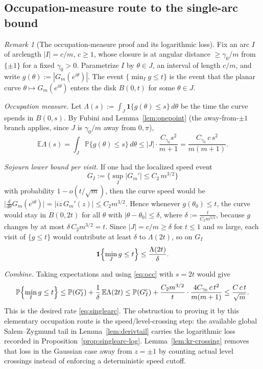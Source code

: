 \documentclass[11pt]{amsart}
\numberwithin{equation}{section}
\theoremstyle{definition}
\theoremstyle{remark}
\newtheorem{remark}[theorem]{Remark}
\newcommand{\Prob}{\mathbb P}
\newcommand{\Exp}{\mathbb E}
\newcommand{\abs}[1]{\left\lvert #1\right\rvert}
\begin{document}
\subsection{Occupation-measure route to the single-arc bound}

\begin{remark}[The occupation-measure proof and its logarithmic loss]
Fix an arc $I$ of arclength $\abs I=c/m$, $c\ge1$, whose closure is at angular distance $\ge\gamma_0/m$ from $\{\pm1\}$ for a fixed $\gamma_0>0$. Parametrize $I$ by $\theta\in J$, an interval of length $c/m$, and write $g(\theta):=\abs{G_m(e^{i\theta})}$. The event $\{\min_I g\le t\}$ is the event that the planar curve $\theta\mapsto G_m(e^{i\theta})$ enters the disk $B(0,t)$ for some $\theta\in J$.

\emph{Occupation measure.} Let $\Lambda(s):=\int_J\mathbf1\{g(\theta)\le s\}\,d\theta$ be the time the curve spends in $B(0,s)$. By Fubini and Lemma~\ref{lem:onepoint} (the away-from-$\pm1$ branch applies, since $J$ is $\gamma_0/m$ away from $0,\pi$),
\begin{equation}\label{eq:occ}
  \Exp\Lambda(s)=\int_J\Prob\{g(\theta)\le s\}\,d\theta\le\abs J\cdot\frac{C_{\gamma_0}s^2}{m+1}=\frac{C_{\gamma_0}\,c\,s^2}{m(m+1)}.
\end{equation}

\emph{Sojourn lower bound per visit.} If one had the localized speed event
\[
  G_I:=\{\sup_I\abs{G_m'}\le C_2\,m^{3/2}\}
\]
with probability \(1-o(t/\sqrt m)\), then the curve speed would be
\(\bigl|\tfrac{d}{d\theta}G_m(e^{i\theta})\bigr|=\abs{iz\,G_m'(z)}\le C_2m^{3/2}\).
Hence whenever $g(\theta_0)\le t$, the curve would stay in $B(0,2t)$ for all $\theta$ with $\abs{\theta-\theta_0}\le\delta$, where $\delta:=\tfrac{t}{C_2 m^{3/2}}$, because $g$ changes by at most $\delta\,C_2 m^{3/2}=t$. Since $\abs J=c/m\ge\delta$ for $t\le1$ and $m$ large, each visit of $\{g\le t\}$ would contribute at least $\delta$ to $\Lambda(2t)$, so on $G_I$
\[
  \mathbf1\Bigl\{\min_J g\le t\Bigr\}\le \frac{\Lambda(2t)}{\delta}.
\]

\emph{Combine.} Taking expectations and using \eqref{eq:occ} with $s=2t$ would give
\[
  \Prob\Bigl\{\min_I g\le t\Bigr\}
  \le\Prob(G_I^c)+\frac{1}{\delta}\,\Exp\Lambda(2t)
  \le\Prob(G_I^c)+\frac{C_2 m^{3/2}}{t}\cdot\frac{4C_{\gamma_0}\,c\,t^2}{m(m+1)}
  \le \frac{C\,c\,t}{\sqrt m}.
\]
This is the desired rate \eqref{eq:singlearc}.  The obstruction to proving it by
this elementary occupation route is the speed/level-crossing step: the available
global Salem--Zygmund tail in Lemma~\ref{lem:derivtail} carries the logarithmic
loss recorded in Proposition~\ref{prop:singlearc-log}.  Lemma~\ref{lem:kr-crossing}
removes that loss in the Gaussian case away from \(z=\pm1\) by counting actual
level crossings instead of enforcing a deterministic speed cutoff.
\end{remark}
\end{document}
